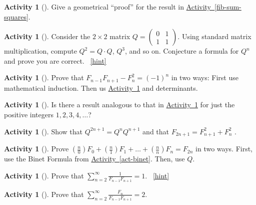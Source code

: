\documentclass[10pt,]{book}
\theoremstyle{plain}
\theoremstyle{definition}
\theoremstyle{definition}
\theoremstyle{definition}
\newtheorem{activity}[project]{Activity}
\numberwithin{equation}{chapter}
\newcommand{\amp}{&}
\begin{document}
\begin{activity}[]\label{activity-93}
\hypertarget{p-537}{}%
Give a geometrical ``proof'' for the result in \hyperref[fib-sum-squares]{Activity~\ref{fib-sum-squares}}.%
\end{activity}
\begin{activity}[]\label{fib-matrix}
\hypertarget{p-538}{}%
Consider the \(2\times 2\) matrix \(Q =
\begin{pmatrix}
0 \amp 1\\
1 \amp 1
\end{pmatrix}.\) Using standard matrix multiplication, compute \(Q^2 = Q\cdot Q\), \(Q^3\), and so on.  Conjecture a formula for \(Q^n\) and prove you are correct.%
~\hfill{\tiny\hyperlink{a-94}{[hint]}\hypertarget{q-94}{}}\end{activity}
\begin{activity}[]\label{fib-neg-one}
\hypertarget{p-540}{}%
Prove that \(F_{n - 1}F_{n + 1} - F_{n}^{2} = (-1)^{n}\) in two ways:  First use mathematical induction.  Then us \hyperref[fib-matrix]{Activity~\ref{fib-matrix}} and determinants.%
\end{activity}
\begin{activity}[]\label{activity-96}
\hypertarget{p-541}{}%
Is there a result analogous to that in \hyperref[fib-neg-one]{Activity~\ref{fib-neg-one}} for just the positive integers \(1, 2, 3, 4, \ldots\)?%
\end{activity}
\begin{activity}[]\label{activity-97}
\hypertarget{p-542}{}%
Show that \(Q^{2n + 1} = Q^{n}Q^{n+1}\) and that \(F_{2n + 1} = F_{n + 1}^{2} + F_{n}^{2}\) .%
\end{activity}
\begin{activity}[]\label{activity-98}
\hypertarget{p-543}{}%
Prove \(\left( \frac{n}{0} \right)F_{0} + \left( \frac{n}{1} \right)F_{1} + \ldots + \left( \frac{n}{n} \right)F_{n} = F_{2n}\) in two ways.  First, use the Binet Formula from \hyperref[act-binet]{Activity~\ref{act-binet}}.  Then, use \(Q\).%
\end{activity}
\begin{activity}[]\label{activity-99}
\hypertarget{p-544}{}%
Prove that \(\sum_{n = 2}^{\infty}\frac{1}{F_{n - 1}F_{n + 1}} = 1\).%
~\hfill{\tiny\hyperlink{a-99}{[hint]}\hypertarget{q-99}{}}\end{activity}
\begin{activity}[]\label{activity-100}
\hypertarget{p-546}{}%
Prove that \(\sum_{n = 2}^{\infty}\frac{F_{n}}{F_{n - 1}F_{n + 1}} = 2.\)%
\end{activity}
\end{document}
